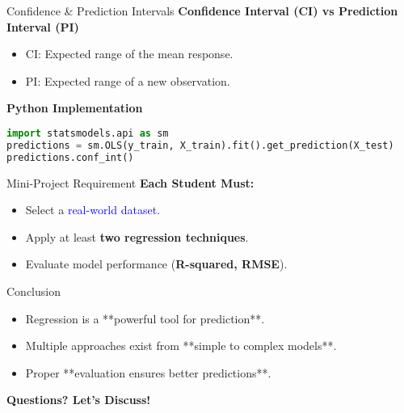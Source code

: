 \documentclass{beamer}
\begin{document}
\begin{frame}[fragile]{Confidence & Prediction Intervals}
    \textbf{Confidence Interval (CI) vs Prediction Interval (PI)}
    \begin{itemize}
        \item CI: Expected range of the mean response.
        \item PI: Expected range of a new observation.
    \end{itemize}
    \textbf{Python Implementation}
    \begin{lstlisting}[language=Python]
import statsmodels.api as sm
predictions = sm.OLS(y_train, X_train).fit().get_prediction(X_test)
predictions.conf_int()
    \end{lstlisting}
\end{frame}

\begin{frame}{Mini-Project Requirement}
    \textbf{Each Student Must:}
    \begin{itemize}
        \item Select a \textcolor{blue}{real-world dataset}.
        \item Apply at least \textbf{two regression techniques}.
        \item Evaluate model performance (\textbf{R-squared, RMSE}).
    \end{itemize}
\end{frame}

\begin{frame}{Conclusion}
    \begin{itemize}
        \item Regression is a **powerful tool for prediction**.
        \item Multiple approaches exist from **simple to complex models**.
        \item Proper **evaluation ensures better predictions**.
    \end{itemize}
    \textbf{Questions? Let's Discuss!}
\end{frame}
\end{document}
